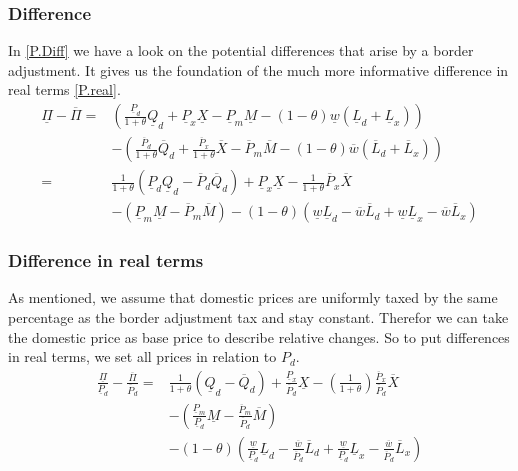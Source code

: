 \subsubsection*{Difference}
In \eqref{P.Diff} we have a look on the potential differences that arise by a border adjustment. It gives us the foundation of the much more informative difference in real terms \eqref{P.real}.
\begin{equation}\label{P.Diff}
\begin{aligned}
\underline \Pi - \overline \Pi = & \left( \frac{\underline P_d}{1+\theta}\underline Q_d +\underline P_x\underline X -  \underline P_m \underline M -  \left( 1-\theta \right) \underline w  \left( \underline L_d + \underline L_x \right)  \right)  \\ &-  \left( \frac{\overline P_d}{1+\theta}\overline Q_d + \frac{\overline P_x}{1+\theta}\overline X - \overline P_m \overline M  -  \left( 1-\theta \right) \overline w  \left( \overline L_d + \overline L_x \right)  \right) \\ 
= &\frac{1}{1+\theta}  \left( \underline P_d \underline Q_d - \overline P_d  \overline Q_d \right)  +\underline P_x\underline X - \frac{1}{1+\theta}\overline P_x \overline X \\ &-  \left(  \underline P_m \underline M -  \overline P_m \overline M \right)  -  \left( 1-\theta \right)  \left( \underline w \underline L_d - \overline w \overline L_d + \underline w \underline L_x - \overline w \overline L_x \right) 
\end{aligned}
\end{equation}

\subsubsection*{Difference in real terms}
As mentioned, we assume that domestic prices are uniformly taxed by the same percentage as the border adjustment tax and stay constant. Therefor we can take the domestic price as base price to describe relative changes. So to put differences in real terms, we set all prices in relation to $P_d$.
\begin{equation}\label{P.real}
\begin{aligned}
\frac{\underline \Pi}{\underline P_d} - \frac{\overline \Pi}{\overline P_d} = &\frac{1}{1+\theta} \left( \underline Q_d - \overline Q_d \right)  + \frac{\underline P_x}{\overline P_d}\underline X -  \left( \frac{1}{1+\theta} \right) \frac{\overline P_x}{\overline P_d}\overline X \\ &-  \left( \frac{ \underline P_m}{\underline P_d}\underline M - \frac{\overline P_m}{\overline P_d}\overline M \right)  \\ &-  \left( 1-\theta \right)  \left( \frac {\underline w}{\underline P_d} \underline L_d - \frac {\overline w}{\overline P_d} \overline L_d + \frac {\underline w}{\underline P_d} \underline L_x - \frac {\overline w}{\overline P_d} \overline L_x \right) 
\end{aligned}
\end{equation}

